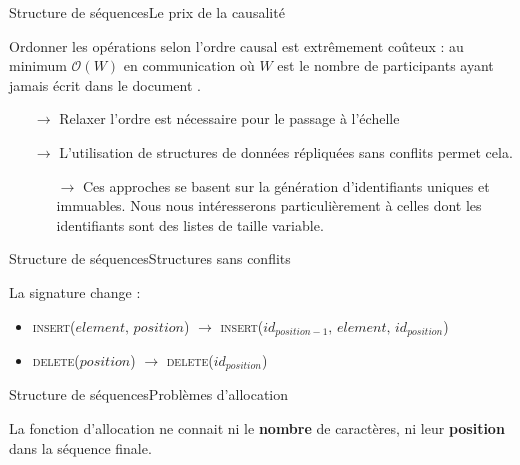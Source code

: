\begin{frame}{Structure de séquences}{Le prix de la causalité}
  
  Ordonner les opérations selon l'ordre causal est extrêmement coûteux : au
  minimum $\mathcal{O}(W)$ en communication où $W$ est le nombre de participants
  ayant jamais écrit dans le document .
  \begin{itemize}
  \item[$\rightarrow$] Relaxer l'ordre est nécessaire pour le passage à l'échelle
  \end{itemize}
  
  \vspace{0.5cm}
  
  \large
  \begin{itemize}
  \item [$\rightarrow$] L'utilisation de structures de données répliquées sans
    conflits  permet cela.
    \begin{itemize}
    \item [$\rightarrow$] Ces approches se basent sur la génération
      d'identifiants uniques et immuables. Nous nous intéresserons
      particulièrement à celles dont les identifiants sont des listes de taille
      variable.
    \end{itemize}
  \end{itemize}

\end{frame}

\begin{frame}{Structure de séquences}{Structures sans conflits}
  
  La signature change : 
  \begin{itemize}
  \item \textsc{insert}($element,\, position$) $\rightarrow$
    \textsc{insert}($id_{position-1},\, element,\, id_{position}$)
  \item \textsc{delete}($position$) $\rightarrow$ \textsc{delete}($id_{position}$)
  \end{itemize}

  \vspace{0.5cm}
  

  \begin{algorithm}[H]
    
  \end{algorithm}

\end{frame}


\begin{frame}{Structure de séquences}{Problèmes d'allocation}

  La fonction d'allocation ne connait ni le \textbf{nombre} de caractères, ni
  leur \textbf{position} dans la séquence finale.

  \vspace{0.5cm}

  \begin{center}
    
  \end{center}

\end{frame}


